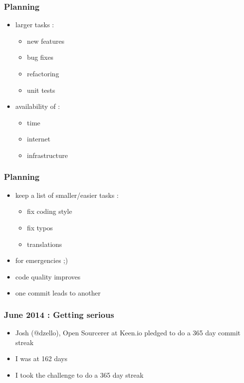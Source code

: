 \documentclass[14pt]{beamer}
\begin{document}
  \begin{frame}
    \frametitle{Planning}
    \begin{itemize}
      \item larger tasks :
      \begin{itemize}
        \item new features
        \item bug fixes
        \item refactoring
        \item unit tests
      \end{itemize}
      \item availability of :
      \begin{itemize}
        \item time
        \item internet
        \item infrastructure
      \end{itemize}
    \end{itemize}
  \end{frame}
  \begin{frame}
    \frametitle{Planning}
    \begin{itemize}
      \item keep a list of smaller/easier tasks :
      \begin{itemize}
        \item fix coding style
        \item fix typos
        \item translations
      \end{itemize}
      \item for emergencies ;)
      \item code quality improves
      \item one commit leads to another
    \end{itemize}
  \end{frame}
  \begin{frame}
    \frametitle{June 2014 : Getting serious}
    \begin{itemize}
      \item Josh (@dzello), Open Sourcerer at Keen.io pledged to do a 365 day commit streak
      \item I was at 162 days
      \item I took the challenge to do a 365 day streak
    \end{itemize}
  \end{frame}
\end{document}
